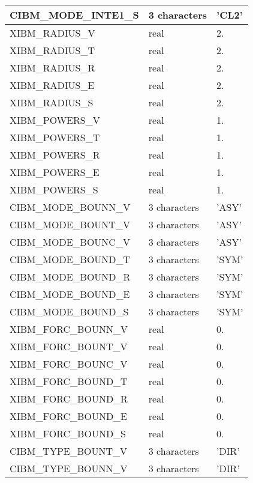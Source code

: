 \begin{longtable} {|p{}|p{}|p{}|}
CIBM\_MODE\_INTE1\_S & 3 characters  & 'CL2'         \\\hline
XIBM\_RADIUS\_V      & real          & 2.            \\
XIBM\_RADIUS\_T      & real          & 2.            \\
XIBM\_RADIUS\_R      & real          & 2.            \\
XIBM\_RADIUS\_E      & real          & 2.            \\\hline
XIBM\_RADIUS\_S      & real          & 2.            \\
XIBM\_POWERS\_V      & real          & 1.            \\
XIBM\_POWERS\_T      & real          & 1.            \\
XIBM\_POWERS\_R      & real          & 1.            \\
XIBM\_POWERS\_E      & real          & 1.            \\
XIBM\_POWERS\_S      & real          & 1.            \\\hline
CIBM\_MODE\_BOUNN\_V & 3 characters  & 'ASY'         \\
CIBM\_MODE\_BOUNT\_V & 3 characters  & 'ASY'         \\
CIBM\_MODE\_BOUNC\_V & 3 characters  & 'ASY'         \\
CIBM\_MODE\_BOUND\_T & 3 characters  & 'SYM'         \\
CIBM\_MODE\_BOUND\_R & 3 characters  & 'SYM'         \\
CIBM\_MODE\_BOUND\_E & 3 characters  & 'SYM'         \\
CIBM\_MODE\_BOUND\_S & 3 characters  & 'SYM'         \\\hline
XIBM\_FORC\_BOUNN\_V & real          & 0.            \\
XIBM\_FORC\_BOUNT\_V & real          & 0.            \\
XIBM\_FORC\_BOUNC\_V & real          & 0.            \\
XIBM\_FORC\_BOUND\_T & real          & 0.            \\
XIBM\_FORC\_BOUND\_R & real          & 0.            \\
XIBM\_FORC\_BOUND\_E & real          & 0.            \\
XIBM\_FORC\_BOUND\_S & real          & 0.            \\\hline
CIBM\_TYPE\_BOUNT\_V & 3 characters  & 'DIR'         \\
CIBM\_TYPE\_BOUNN\_V & 3 characters  & 'DIR'         \\

\end{longtable}
